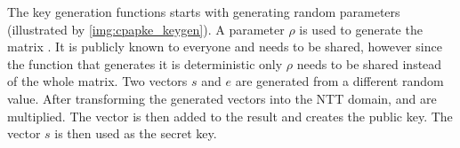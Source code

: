 The key generation functions starts with generating random parameters (illustrated by \ref{img:cpapke_keygen}). A parameter $\rho$ is used to generate the matrix . It is publicly known to everyone and needs to be shared, however since the function that generates it is deterministic only $\rho$ needs to be shared instead of the whole matrix. Two vectors $s$ and $e$ are generated from a different random value. After transforming the generated vectors into the NTT domain,  and  are multiplied. The vector  is then added to the result and creates the public key. The vector $s$ is then used as the secret key.

